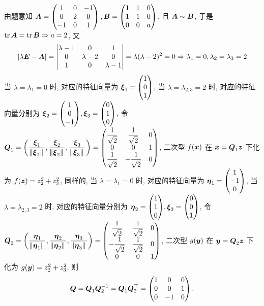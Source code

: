 \begin{solution}
    由题意知 $\vb*{A}=\begin{pmatrix} 1 & 0 & -1 \\ 0 & 2 & 0 \\ -1 & 0 & 1 \\\end{pmatrix}, \vb*{B}=\begin{pmatrix} 1 & 1 & 0 \\ 1 & 1 & 0 \\ 0 & 0 & a \\\end{pmatrix}$, 且 $\vb*{A}\sim \vb*{B}$, 于是 $\tr\vb*{A}=\tr\vb*{B}\Rightarrow a=2$, 又 
    $$
    |\lambda\vb*{E}-\vb*{A}|=\mqty|\lambda-1 & 0 & 1 \\ 0 & \lambda-2 & 0 \\ 1 & 0 & \lambda-1 |=\lambda(\lambda-2)^2=0\Rightarrow \lambda_1=0,\lambda_2=\lambda_3=2
    $$
    当 $\lambda=\lambda_1=0$ 时, 对应的特征向量为 $\vb*{\xi}_1=\mqty(1\\0\\1)$, 当 $\lambda=\lambda_{2,3}=2$ 时, 对应的特征向量分别为
    $\vb*{\xi}_2=\mqty(1\\0\\-1),\vb*{\xi}_3=\mqty(0\\1\\0)$, 令 $\vb*{Q}_1=\qty(\dfrac{\vb*{\xi}_1}{\norm*{\vb*{\xi}_1}},\dfrac{\vb*{\xi}_2}{\norm*{\vb*{\xi}_2}},\dfrac{\vb*{\xi}_3}{\norm*{\vb*{\xi}_3}})=\mqty(\dfrac{1}{\sqrt{2}}&\dfrac{1}{\sqrt{2}}&0\\ 0&0&1\\ \dfrac{1}{\sqrt{2}}&-\dfrac{1}{\sqrt{2}}&0)$, 二次型 $f(\vb*{x})$ 在 $\vb*{x}=\vb*{Q}_1\vb*{z}$ 下化为 $f(\vb*{z})=z_2^2+z_3^2$, 同样的, 当 $\lambda=\lambda_1=0$ 时, 对应的特征向量为 $\vb*{\eta}_1=\mqty(1\\-1\\0)$, 当 $\lambda=\lambda_{2,3}=2$ 时, 对应的特征向量分别为 $\vb*{\eta}_2=\mqty(1\\1\\0),\vb*{\xi}_3=\mqty(0\\0\\1)$, 令 $\vb*{Q}_2=\qty(\dfrac{\vb*{\eta}_1}{\norm*{\vb*{\eta}_1}},\dfrac{\vb*{\eta}_2}{\norm*{\vb*{\eta}_2}},\dfrac{\vb*{\eta}_3}{\norm*{\vb*{\eta}_3}})=\mqty(\dfrac{1}{\sqrt{2}}&\dfrac{1}{\sqrt{2}}&0\\[6pt]-\dfrac{1}{\sqrt{2}}&\dfrac{1}{\sqrt{2}}&0\\0&0&1)$, 二次型 $g(\vb*{y})$ 在 $\vb*{y}=\vb*{Q}_2\vb*{z}$ 下化为 $g(\vb*{y})=z_2^2+z_3^2$, 则 
    $$\vb*{Q}=\vb*{Q}_1\vb*{Q}_2^{-1}=\vb*{Q}_1\vb*{Q}_2^\top=\begin{pmatrix} 1 & 0 & 0 \\ 0 & 0 & 1 \\ 0 & -1 & 0 \\\end{pmatrix}.$$
\end{solution}

